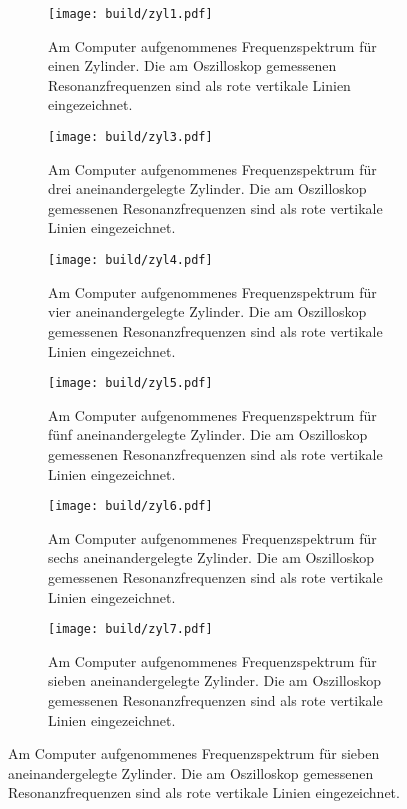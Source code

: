 \newpage
{}
\label{sec:Anhang}
\begin{figure}[h!]
  \centering
  \begin{subfigure}{0.49\textwidth}
    \centering
    \texttt{[image: build/zyl1.pdf]}
    \caption{Am Computer aufgenommenes Frequenzspektrum für einen
    Zylinder. Die am Oszilloskop gemessenen Resonanzfrequenzen sind als rote vertikale
    Linien eingezeichnet.}
    \label{fig:zyl1}
  \end{subfigure}
  \begin{subfigure}{0.49\textwidth}
    \centering
    \texttt{[image: build/zyl3.pdf]}
    \caption{Am Computer aufgenommenes Frequenzspektrum für drei aneinandergelegte
    Zylinder. Die am Oszilloskop gemessenen Resonanzfrequenzen sind als rote vertikale
    Linien eingezeichnet.}
    \label{fig:zyl3}
  \end{subfigure}
  \begin{subfigure}{0.49\textwidth}
    \centering
    \texttt{[image: build/zyl4.pdf]}
    \caption{Am Computer aufgenommenes Frequenzspektrum für vier aneinandergelegte
    Zylinder. Die am Oszilloskop gemessenen Resonanzfrequenzen sind als rote vertikale
    Linien eingezeichnet.}
    \label{fig:zyl4}
  \end{subfigure}
  \begin{subfigure}{0.49\textwidth}
    \centering
    \texttt{[image: build/zyl5.pdf]}
    \caption{Am Computer aufgenommenes Frequenzspektrum für fünf aneinandergelegte
    Zylinder. Die am Oszilloskop gemessenen Resonanzfrequenzen sind als rote vertikale
    Linien eingezeichnet.}
    \label{fig:zyl5}
  \end{subfigure}
  \begin{subfigure}{0.49\textwidth}
    \centering
    \texttt{[image: build/zyl6.pdf]}
    \caption{Am Computer aufgenommenes Frequenzspektrum für sechs aneinandergelegte
    Zylinder. Die am Oszilloskop gemessenen Resonanzfrequenzen sind als rote vertikale
    Linien eingezeichnet.}
    \label{fig:zyl6}
  \end{subfigure}
  \begin{subfigure}{0.49\textwidth}
    \centering
    \texttt{[image: build/zyl7.pdf]}
    \caption{Am Computer aufgenommenes Frequenzspektrum für sieben aneinandergelegte
    Zylinder. Die am Oszilloskop gemessenen Resonanzfrequenzen sind als rote vertikale
    Linien eingezeichnet.}
    \label{fig:zyl7}
  \end{subfigure}
\end{figure}


